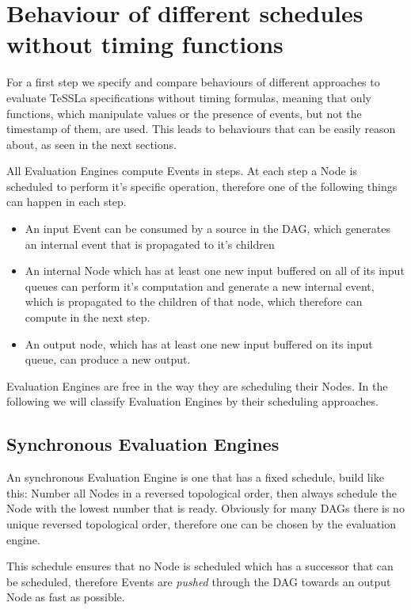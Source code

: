 \section{Behaviour of different schedules without timing functions}
\label{sec:concepts:behaviour_without_timing}

For a first step we specify and compare behaviours of different approaches to evaluate TeSSLa specifications without timing formulas,
meaning that only functions, which manipulate values or the presence of events, but not the timestamp of them, are used.
This leads to behaviours that can be easily reason about, as seen in the next sections.

All Evaluation Engines compute Events in steps.
At each step a Node is scheduled to perform it's specific operation, therefore one of the following things can happen in each step.

\begin{itemize}
  \item An input Event can be consumed by a source in the DAG, which generates an internal event that is propagated to it's children
  \item An internal Node which has at least one new input buffered on all of its input queues can perform
    it's computation and generate a new internal event, which is propagated to the children of that node, which therefore can compute in the next step.
  \item An output node, which has at least one new input buffered on its input queue, can produce a new output.
\end{itemize}

Evaluation Engines are free in the way they are scheduling their Nodes.
In the following we will classify Evaluation Engines by their scheduling approaches.

\subsection{Synchronous Evaluation Engines}
\label{sec:concepts:behaviour_without_timing:synchronous}

An synchronous Evaluation Engine is one that has a fixed schedule, build like this:
Number all Nodes in a reversed topological order, then always schedule the Node with the lowest number that is ready.
Obviously for many DAGs there is no unique reversed topological order, therefore one can be chosen by the evaluation engine.

This schedule ensures that no Node is scheduled which has a successor that can be scheduled, therefore Events are \emph{pushed} through the DAG towards an output Node as fast as possible.

